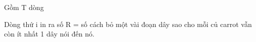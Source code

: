 Gồm T dòng

Dòng thứ i in ra số R = số cách bỏ một vài đoạn dây sao cho mỗi củ carrot vẫn còn ít nhất 1 dây nói đến nó.